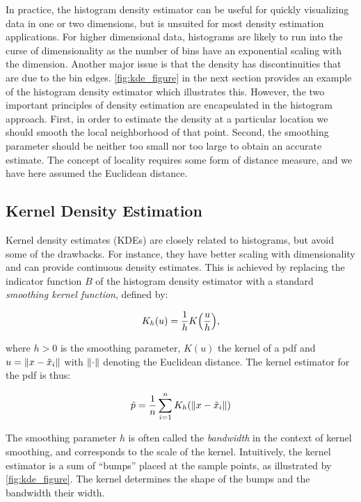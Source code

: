 In practice, the histogram density estimator can be useful for quickly visualizing data in one or two dimensions, but is unsuited for most density estimation applications. For higher dimensional data, histograms are likely to run into the curse of dimensionality as the number of bins have an exponential scaling with the dimension. Another major issue is that the density has discontinuities that are due to the bin edges. \autoref{fig:kde_figure} in the next section provides an example of the histogram density estimator which illustrates this. However, the two important principles of density estimation are encapsulated in the histogram approach. First, in order to estimate the density at a particular location we should smooth the local neighborhood of that point. Second, the smoothing parameter should be neither too small nor too large to obtain an accurate estimate. The concept of locality requires some form of distance measure, and we have here assumed the Euclidean distance.

\subsection{Kernel Density Estimation}

Kernel density estimates (KDEs) are closely related to histograms, but avoid some of the drawbacks. For instance, they have better scaling with dimensionality and can provide continuous density estimates. This is achieved by replacing the indicator function $B$ of the histogram density estimator with a standard \textit{smoothing kernel function}, defined by: 

\begin{equation}\label{eq:kernel_smooth_func}
    K_h (u) = \frac{1}{h} K \qty(\frac{u}{h}),  
\end{equation}

where $h>0$ is the smoothing parameter, $K(u)$ the kernel of a pdf and $u = \norm{x - \tilde{x}_i}$ with $\norm{\cdot}$ denoting the Euclidean distance. The kernel estimator for the pdf is thus: 

\begin{equation}\label{eq:kde}
    \hat{p} = \frac{1}{n} \sum_{i=1}^n K_h \qty(\norm{x - \tilde{x}_i})
\end{equation}

The smoothing parameter $h$ is often called the \textit{bandwidth} in the context of kernel smoothing, and corresponds to the scale of the kernel. Intuitively, the kernel estimator is a sum of “bumps” placed at the sample points, as illustrated by \autoref{fig:kde_figure}. The kernel determines the shape of the bumps and the bandwidth their width. 

